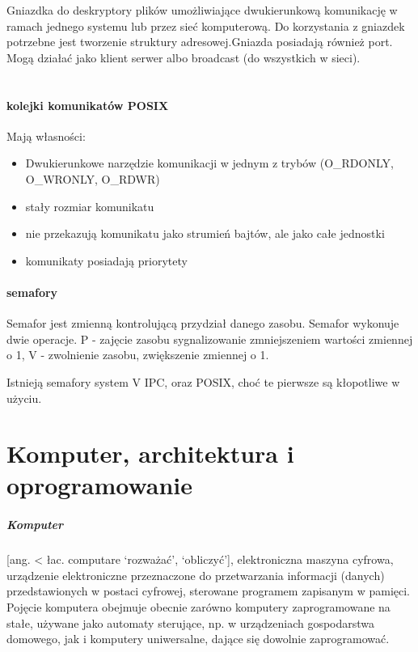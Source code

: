 \documentclass[a4paper,twoside]{report}
\begin{document}
Gniazdka do deskryptory plików umożliwiające dwukierunkową komunikację w ramach jednego systemu lub przez sieć komputerową. Do korzystania z gniazdek potrzebne jest tworzenie struktury adresowej.Gniazda posiadają również port. Mogą działać jako klient serwer albo broadcast (do wszystkich w sieci).\\
\\
\subsubsection{kolejki komunikatów POSIX}
Mają własności: 
\begin{itemize}
	\item Dwukierunkowe narzędzie komunikacji w jednym z trybów (O\_RDONLY, O\_WRONLY, O\_RDWR)
	\item stały rozmiar komunikatu
	\item nie przekazują komunikatu jako strumień bajtów, ale jako całe jednostki
	\item komunikaty posiadają priorytety
\end{itemize}


\subsubsection{semafory}
Semafor jest zmienną kontrolującą przydział danego zasobu. Semafor wykonuje dwie operacje. P - zajęcie zasobu sygnalizowanie zmniejszeniem wartości zmiennej o 1, V - zwolnienie zasobu, zwiększenie zmiennej o 1.

Istnieją semafory system V IPC, oraz POSIX, choć te pierwsze są kłopotliwe w użyciu.

\chapter{Komputer, architektura i oprogramowanie}
\paragraph{Komputer} [ang. < łac. computare ‘rozważać’, ‘obliczyć’], elektroniczna maszyna cyfrowa, urządzenie elektroniczne przeznaczone do przetwarzania informacji (danych) przedstawionych w postaci cyfrowej, sterowane programem zapisanym w pamięci.
Pojęcie komputera obejmuje obecnie zarówno komputery zaprogramowane na stałe, używane jako automaty sterujące, np. w urządzeniach gospodarstwa domowego, jak i komputery uniwersalne, dające się dowolnie zaprogramować.
\end{document}
